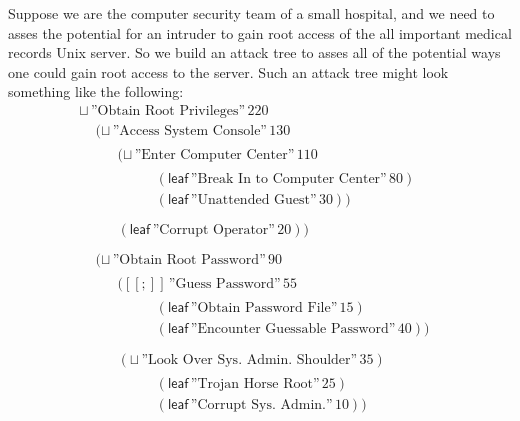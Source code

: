 \documentclass{sigplanconf}
\begin{document}
Suppose we are the computer security team of a small hospital, and we
need to asses the potential for an intruder to gain root access of the
all important medical records Unix server.  So we build an attack tree
to asses all of the potential ways one could gain root access to the
server.  Such an attack tree might look something like the following:
\[
  \begin{array}{lll}
    \sqcup\,\text{''Obtain Root Privileges''}\,220\\
    \,\,\,\,\,\,\,(\sqcup\,\text{''Access System Console''}\,130\\
    \,\,\,\,\,\,\,\,\,\,\,\,\,\,\begin{array}{lll}
    (\sqcup\,\text{''Enter Computer Center''}\,110\\
    \,\,\,\,\,\,\,\,\,\,\,\,\,\,\begin{array}{lll}
    (\mathsf{leaf}\,\text{''Break In to Computer Center''}\,80)\\
    (\mathsf{leaf}\,\text{''Unattended Guest''}\,30))\\
    \end{array}\\
    (\mathsf{leaf}\,\text{''Corrupt Operator''}\,20))\\
    \end{array}\\
    \,\,\,\,\,\,\,(\sqcup\,\text{''Obtain Root Password''}\,90\\
    \,\,\,\,\,\,\,\,\,\,\,\,\,\,\begin{array}{lll}
    ([[;]]\,\text{''Guess Password''}\,55\\
    \,\,\,\,\,\,\,\,\,\,\,\,\,\,\begin{array}{lll}
    (\mathsf{leaf}\,\text{''Obtain Password File''}\,15)\\
    (\mathsf{leaf}\,\text{''Encounter Guessable Password''}\,40))\\
    \end{array}\\
    (\sqcup\,\text{''Look Over Sys. Admin. Shoulder''}\,35)\\
    \,\,\,\,\,\,\,\,\,\,\,\,\,\,\begin{array}{lll}
    (\mathsf{leaf}\,\text{''Trojan Horse Root''}\,25)\\
    (\mathsf{leaf}\,\text{''Corrupt Sys. Admin.''}\,10))\\
    \end{array}    
    \end{array}
  \end{array}
\]
\end{document}
